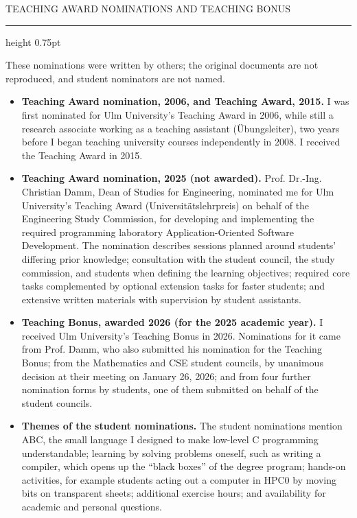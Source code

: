 \documentclass[10pt]{article}
\newcommand{\headsize}{\fontsize{10.5pt}{12.8pt}\selectfont}
\newcommand{\smallsize}{\fontsize{9.5pt}{11.6pt}\selectfont}
\newcommand{\cvsection}[1]{%
  \par\vspace{9pt}%
  {\headsize\bfseries\color{heading}\strut#1\par}%
  \nopagebreak\vspace{1pt}%
  {\color{rule}\hrule height 0.75pt}%
  \nopagebreak\vspace{3pt}%
  \prevdepth=2.7pt\relax
}
\newcommand{\para}[1]{{#1\par}\vspace{3pt}}
\newenvironment{cvitems}
  {\begin{itemize}[label=•, leftmargin=15pt, labelwidth=10pt, labelsep=0pt,
                   align=left, topsep=0pt, partopsep=0pt, parsep=0pt,
                   itemsep=2pt, beginpenalty=10000]}
  {\end{itemize}\vspace{3pt}}
\begin{document}
\newpage
\cvsection{TEACHING AWARD NOMINATIONS AND TEACHING BONUS}

\para{{\smallsize These nominations were written by others; the original documents are not reproduced, and student nominators are not named.}}

\begin{cvitems}
  \item \textbf{Teaching Award nomination, 2006, and Teaching Award, 2015.} I was first nominated for Ulm University's Teaching Award in 2006, while still a research associate working as a teaching assistant (Übungsleiter), two years before I began teaching university courses independently in 2008. I received the Teaching Award in 2015.
  \item \textbf{Teaching Award nomination, 2025 (not awarded).} Prof. Dr.-Ing. Christian Damm, Dean of Studies for Engineering, nominated me for Ulm University's Teaching Award (Universitätslehrpreis) on behalf of the Engineering Study Commission, for developing and implementing the required programming laboratory Application-Oriented Software Development. The nomination describes sessions planned around students' differing prior knowledge; consultation with the student council, the study commission, and students when defining the learning objectives; required core tasks complemented by optional extension tasks for faster students; and extensive written materials with supervision by student assistants.
  \item \textbf{Teaching Bonus, awarded 2026 (for the 2025 academic year).} I received Ulm University's Teaching Bonus in 2026. Nominations for it came from Prof. Damm, who also submitted his nomination for the Teaching Bonus; from the Mathematics and CSE student councils, by unanimous decision at their meeting on January 26, 2026; and from four further nomination forms by students, one of them submitted on behalf of the student councils.
  \item \textbf{Themes of the student nominations.} The student nominations mention ABC, the small language I designed to make low-level C programming understandable; learning by solving problems oneself, such as writing a compiler, which opens up the “black boxes” of the degree program; hands-on activities, for example students acting out a computer in HPC0 by moving bits on transparent sheets; additional exercise hours; and availability for academic and personal questions.
\end{cvitems}
\end{document}
